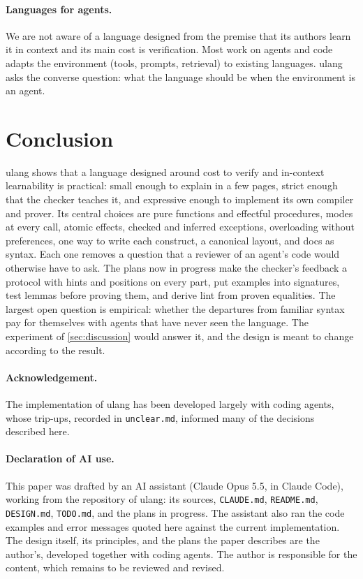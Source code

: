 \documentclass[11pt,a4paper]{article}
\newcommand{\file}[1]{\texttt{#1}}
\begin{document}
\paragraph{Languages for agents.}
We are not aware of a language designed from the premise that its authors learn it in
context and its main cost is verification. Most work on agents and code adapts the
environment (tools, prompts, retrieval) to existing languages. ulang asks the converse
question: what the language should be when the environment is an agent.

\section{Conclusion}

ulang shows that a language designed around cost to verify and in-context learnability is
practical: small enough to explain in a few pages, strict enough that the checker teaches
it, and expressive enough to implement its own compiler and prover. Its central choices are
pure functions and effectful procedures, modes at every call, atomic effects, checked and
inferred exceptions, overloading without preferences, one way to write each construct, a
canonical layout, and docs as syntax. Each one removes a question that a reviewer of an
agent's code would otherwise have to ask. The plans now in progress make the checker's feedback a
protocol with hints and positions on every part, put examples into signatures, test lemmas
before proving them, and derive lint from proven equalities. The largest open question is
empirical: whether the departures from familiar syntax pay for themselves with agents that
have never seen the language. The experiment of \cref{sec:discussion} would answer it, and
the design is meant to change according to the result.

\paragraph{Acknowledgement.}
The implementation of ulang has been developed largely with coding agents, whose trip-ups,
recorded in \file{unclear.md}, informed many of the decisions described here.

\paragraph{Declaration of AI use.}
This paper was drafted by an AI assistant (Claude Opus 5.5, in Claude Code), working from
the repository of ulang: its sources, \file{CLAUDE.md}, \file{README.md}, \file{DESIGN.md},
\file{TODO.md}, and the plans in progress. The assistant also ran the code examples and
error messages quoted here against the current implementation. The design itself, its
principles, and the plans the paper describes are the author's, developed together with
coding agents. The author is responsible for the content, which remains to be reviewed and
revised.



\end{document}
